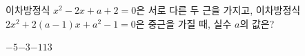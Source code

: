 이차방정식 $x^2-2x+a+2=0$은 서로 다른 두 근을 가지고, 이차방정식 $2x^2+2(a-1)x+a^2-1=0$은 중근을 가질 때, 실수 $a$의 값은?
\begin{choices32}{$-5$}{$-3$}{$-1$}{$1$}{$3$}\end{choices32}
